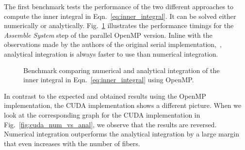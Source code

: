 The first benchmark tests the performance of the two different approaches to compute the inner integral in Eqn.~\eqref{eq:inner_integral}. It can be solved either numerically or analytically. Fig.~\ref{fig:openmp_num_vs_anal} illustrates the performance timings for the \emph{Assemble System} step of the parallel OpenMP version. Inline with the observations made by the authors of the original serial implementation,~\cite{Tornberg2006}, analytical integration is always faster to use than numerical integration.
\begin{figure}[!htbp]
  \centering
  \caption[Benchmark computing inner integral on CPU.]{Benchmark comparing numerical and analytical integration of the inner integral in Eqn.~\eqref{eq:inner_integral} using OpenMP.}
  \label{fig:openmp_num_vs_anal}
\end{figure}

In contrast to the expected and obtained results using the OpenMP implementation, the CUDA implementation shows a different picture. When we look at the corresponding graph for the CUDA implementation in Fig.~\ref{fig:cuda_num_vs_anal}, we observe that the results are reversed. Numerical integration outperforms the analytical integration by a large margin that even increases with the number of fibers.

